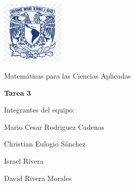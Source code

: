 \documentclass{article}
\begin{document}
\begin{titlepage}
    \centering
    \includegraphics[width=3cm]{logo.png}
    
    \vspace{2cm}
    {\LARGE Matemáticas para las Ciencias Aplicadas\par}
    
    \vspace{2cm}
    {\huge\bfseries Tarea 3\par}
    
    \vspace{2cm}
    {\Large Integrantes del equipo:\par}
    
    \vspace{0.5cm}
    {\Large Mario Cesar Rodriguez Cadenas\par}
    {\Large Christian Eulogio Sánchez\par}
    {\Large Israel Rivera\par}
    {\Large David Rivera Morales\par}
    
    \vfill
    
    
\end{titlepage}
\end{document}
